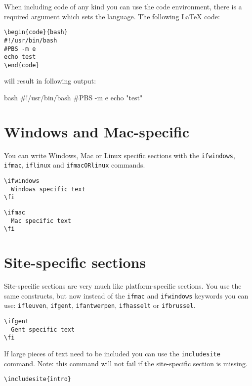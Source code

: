 \documentclass[11pt,a4paper]{article}
\begin{document}
When including code of any kind you can use the code environment, there is a
required argument which sets the language. The following LaTeX code:

\begin{verbatim}
\begin{code}{bash}
#!/usr/bin/bash
#PBS -m e
echo test
\end{code}
\end{verbatim}

will result in following output:

\begin{code}{bash}
#!/usr/bin/bash
#PBS -m e
echo "test"
\end{code}

\section{Windows and Mac-specific}
\label{sec:windows-and-mac-specific}

You can write Windows, Mac or Linux specific sections with the \texttt{ifwindows}, \texttt{ifmac}, \texttt{iflinux} and
\texttt{ifmacORlinux} commands.

\begin{verbatim}
\ifwindows
  Windows specific text
\fi
\end{verbatim}

\begin{verbatim}
\ifmac
  Mac specific text
\fi
\end{verbatim}


\section{Site-specific sections}
\label{sec:site-specific-sections}

Site-specific sections are very much like platform-specific sections. You use
the same constructs, but now instead of the \texttt{ifmac} and \texttt{ifwindows}
keywords you can use: \texttt{ifleuven}, \texttt{ifgent}, \texttt{ifantwerpen},
\texttt{ifhasselt} or \texttt{ifbrussel}.

\begin{verbatim}
\ifgent
  Gent specific text
\fi
\end{verbatim}

If large pieces of text need to be included you can use the
\verb|includesite| command.
Note: this command will not fail if the site-specific section is missing.

\begin{verbatim}
\includesite{intro}
\end{verbatim}
\end{document}
